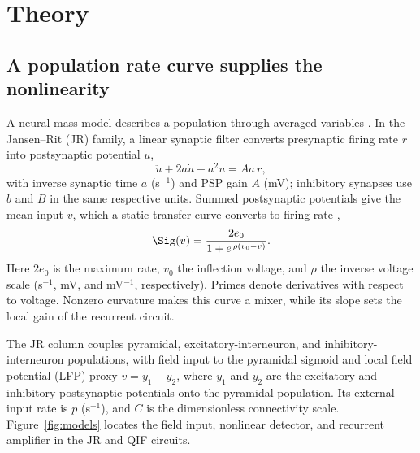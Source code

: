 \section{Theory}

\subsection{A population rate curve supplies the nonlinearity}\label{sec:nmm}
A neural mass model describes a population through averaged variables
\cite{ruffini2025rosetta,jansen1995}. In the Jansen--Rit (JR) family, a linear synaptic
filter converts presynaptic firing rate $r$ into postsynaptic potential $u$,
\[
\ddot u+2a\dot u+a^2u=Aa\,r,
\]
with inverse synaptic time $a$ (s$^{-1}$) and PSP gain $A$ (mV); inhibitory synapses use
$b$ and $B$ in the same respective units. Summed postsynaptic potentials give the mean input $v$, which
a static transfer curve converts to firing rate \cite{wilsoncowan1972},
\begin{equation}
\Sig(v)=\frac{2e_0}{1+e^{\,\rho(v_0-v)}} .
\label{eq:sigmoid}
\end{equation}
Here $2e_0$ is the maximum rate, $v_0$ the inflection voltage, and $\rho$ the inverse
voltage scale (s$^{-1}$, mV, and mV$^{-1}$, respectively). Primes denote
derivatives with respect to voltage. Nonzero curvature makes this curve a mixer, while its slope sets
the local gain of the recurrent circuit.

The JR column couples pyramidal, excitatory-interneuron, and inhibitory-interneuron
populations, with field input to the pyramidal sigmoid and local field potential
(LFP) proxy $v=y_1-y_2$, where $y_1$ and $y_2$ are the excitatory and inhibitory
postsynaptic potentials onto the pyramidal population. Its external input rate is
$p$ (s$^{-1}$), and $C$ is the dimensionless connectivity scale.
Figure~\ref{fig:models} locates the field input, nonlinear detector, and
recurrent amplifier in the JR and QIF circuits.


